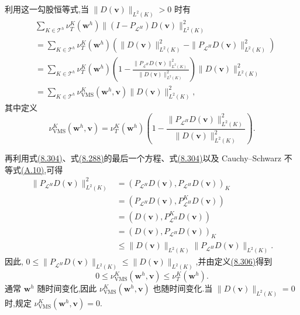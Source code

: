 \begin{note}[修正黏度的定义]
利用这一勾股恒等式,当 $\|D(\bm v)\|_{L^2(K)}>0$ 时有
\begin{equation}\label{eq:vms-coarse-projection-local-viscosity}
\begin{aligned}
 &\sum_{K\in\mathcal T^h}
   \nu_T^K(\bm w^h)
   \|(I-P_{\mathcal L^H})D(\bm v)\|_{L^2(K)}^2\\
 &=\sum_{K\in\mathcal T^h}
   \nu_T^K(\bm w^h)
   \left(\|D(\bm v)\|_{L^2(K)}^2
        -\|P_{\mathcal L^H}D(\bm v)\|_{L^2(K)}^2\right)\\
 &=\sum_{K\in\mathcal T^h}
   \nu_T^K(\bm w^h)
   \left(1-\frac{\|P_{\mathcal L^H}D(\bm v)\|_{L^2(K)}^2}
                 {\|D(\bm v)\|_{L^2(K)}^2}\right)
   \|D(\bm v)\|_{L^2(K)}^2\\
 &=\sum_{K\in\mathcal T^h}
   \nu_{\mathrm{VMS}}^K(\bm w^h,\bm v)
   \|D(\bm v)\|_{L^2(K)}^2,
\end{aligned}
\end{equation}
其中定义
\[
 \nu_{\mathrm{VMS}}^K(\bm w^h,\bm v)
 =\nu_T^K(\bm w^h)
  \left(1-\frac{\|P_{\mathcal L^H}D(\bm v)\|_{L^2(K)}^2}
               {\|D(\bm v)\|_{L^2(K)}^2}\right).
\]

再利用式\hyperref[eq:vms-coarse-projection-local-projection]{(8.304)}、式\hyperref[eq:vms-coarse-projection-three-scale-method]{(8.288)}的最后一个方程、式\hyperref[eq:vms-coarse-projection-local-projection]{(8.304)}以及 Cauchy--Schwarz 不等式\hyperref[eq:appendix-a-10]{(A.10)},可得
\[
\begin{aligned}
 \|P_{\mathcal L^H}D(\bm v)\|_{L^2(K)}^2
 &=(P_{\mathcal L^H}D(\bm v),
      P_{\mathcal L^H}D(\bm v))_K\\
 &=(P_{\mathcal L^H}D(\bm v),
      P_{\mathcal L^H}^KD(\bm v))\\
 &=(D(\bm v),P_{\mathcal L^H}^KD(\bm v))\\
 &=(D(\bm v),P_{\mathcal L^H}D(\bm v))_K\\
 &\le\|D(\bm v)\|_{L^2(K)}
      \|P_{\mathcal L^H}D(\bm v)\|_{L^2(K)}.
\end{aligned}
\]
因此,
$0\le\|P_{\mathcal L^H}D(\bm v)\|_{L^2(K)}
\le\|D(\bm v)\|_{L^2(K)}$,并由定义\hyperref[eq:vms-coarse-projection-local-viscosity]{(8.306)}得到
\begin{equation}\label{eq:vms-coarse-projection-local-viscosity-bounds}
 0\le\nu_{\mathrm{VMS}}^K(\bm w^h,\bm v)
 \le\nu_T^K(\bm w^h).
\end{equation}
通常 $\bm w^h$ 随时间变化,因此
$\nu_{\mathrm{VMS}}^K(\bm w^h,\bm v)$ 也随时间变化.当
$\|D(\bm v)\|_{L^2(K)}=0$ 时,规定
$\nu_{\mathrm{VMS}}^K(\bm w^h,\bm v)=0$.
\end{note}

